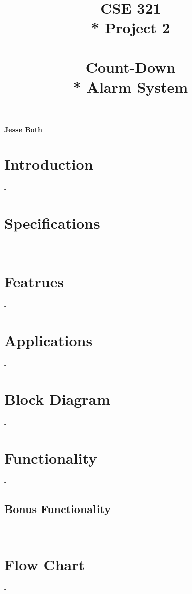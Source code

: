 \documentclass{article}
\title{\Huge{\textbf{CSE 321} \\*  Project 2 \\~\\ \textbf{Count-Down \\* Alarm System}}}
\date{} %
\begin{document}
    \maketitle
    \vfill 
    {\Large\centering\textbf{Jesse Both}\par}
    {\large\centering{\today}\par}
    \newpage
    \begin{center}
        \tableofcontents
    \end{center}
\newpage
\setcounter{secnumdepth}{-1}


\section{Introduction}
-
\newline

\section{Specifications}
-
\newline

\section{Featrues}
-
\newline

\section{Applications}
-
\newline

\section{Block Diagram}
-
\newline

\section{Functionality}
-
\newline

\subsection{Bonus Functionality}
-
\newline

\section{Flow Chart}
-
\newline
\end{document}
